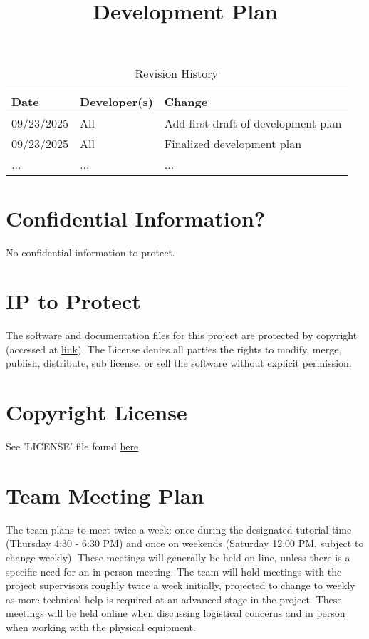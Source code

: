 \documentclass{article}
\title{Development Plan\\\progname}
\author{\authname}
\date{}
\begin{document}
\maketitle

\begin{table}[hp]
\caption{Revision History} \label{TblRevisionHistory}
\begin{tabularx}{\textwidth}{llX}
\toprule
\textbf{Date} & \textbf{Developer(s)} & \textbf{Change}\\
\midrule
09/23/2025 & All & Add first draft of development plan\\
09/23/2025 & All & Finalized development plan\\
... & ... & ...\\
\bottomrule
\end{tabularx}
\end{table}

\newpage{}

\section{Confidential Information?}

No confidential information to protect.

\section{IP to Protect}

\hspace{\parindent}The software and documentation files for this project are protected by copyright (accessed at \href{https://github.com/mansha71/CapstoneProject/blob/main/LICENSE}{ link}). The License denies all parties the rights to modify, merge, publish, distribute, sub license, or sell the software without explicit permission.

\section{Copyright License}

See 'LICENSE' file found
\href{https://github.com/mansha71/CapstoneProject/blob/main/LICENSE}{here}.

\section{Team Meeting Plan}

\hspace{\parindent} The team plans to meet twice a week: once during the designated tutorial time (Thursday 4:30 - 6:30 PM) and once on weekends (Saturday 12:00 PM, subject to change weekly). These meetings will generally be held on-line, unless there is a specific need for an in-person meeting. The team will hold meetings with the project supervisors roughly twice a week initially, projected to change to weekly as more technical help is required at an advanced stage in the project. These meetings will be held online when discussing logistical concerns and in person when working with the physical equipment.
\end{document}
